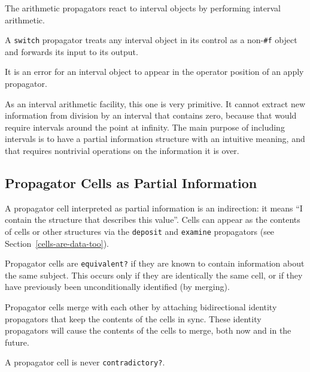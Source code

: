 \documentclass[12pt,letterpaper,english]{article}
\begin{document}
The arithmetic propagators react to interval objects by performing
interval arithmetic.

A \texttt{switch} propagator treats any interval object in its control as a
non-\texttt{{\#}f} object and forwards its input to its output.

It is an error for an interval object to appear in the operator
position of an apply propagator.

As an interval arithmetic facility, this one is very primitive.  It
cannot extract new information from division by an interval that contains zero, because that 
would require intervals around the point at infinity.
The main purpose of including intervals is to have a partial
information structure with an intuitive meaning, and that requires
nontrivial operations on the information it is over.



\hypertarget{propagator-cells-as-partial-information}{}
\subsection{Propagator Cells as Partial Information}
\label{propagator-cells-as-partial-information}

A propagator cell interpreted as partial information is an
indirection: it means ``I contain the structure that describes this
value''.  Cells can appear as the contents of cells or other structures
via the \texttt{deposit} and \texttt{examine} propagators
(see Section~\ref{cells-are-data-too}).

Propagator cells are \texttt{equivalent?} if they are known to contain
information about the same subject.  This occurs only if they are
identically the same cell, or if they have previously been
unconditionally identified (by merging).

Propagator cells merge with each other by attaching bidirectional
identity propagators that keep the contents of the cells in sync.
These identity propagators will cause the contents of the cells to
merge, both now and in the future.

A propagator cell is never \texttt{contradictory?}.



\hypertarget{id1}{}
\end{document}
